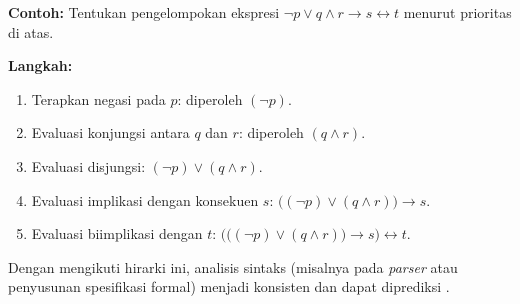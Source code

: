\textbf{Contoh:} Tentukan pengelompokan ekspresi $\neg p \vee q \wedge r \rightarrow s \leftrightarrow t$ menurut prioritas di atas.

\textbf{Langkah:}
\begin{enumerate}
    \item Terapkan negasi pada $p$: diperoleh $(\neg p)$.
    \item Evaluasi konjungsi antara $q$ dan $r$: diperoleh $(q \wedge r)$.
    \item Evaluasi disjungsi: $(\neg p) \vee (q \wedge r)$.
    \item Evaluasi implikasi dengan konsekuen $s$: $\big((\neg p) \vee (q \wedge r)\big) \rightarrow s$.
    \item Evaluasi biimplikasi dengan $t$: $\Big(\big((\neg p) \vee (q \wedge r)\big) \rightarrow s\Big) \leftrightarrow t$.
\end{enumerate}

Dengan mengikuti hirarki ini, analisis sintaks (misalnya pada \textit{parser} atau penyusunan spesifikasi formal) menjadi konsisten dan dapat diprediksi \cite{wiki_first_order_logic}.
